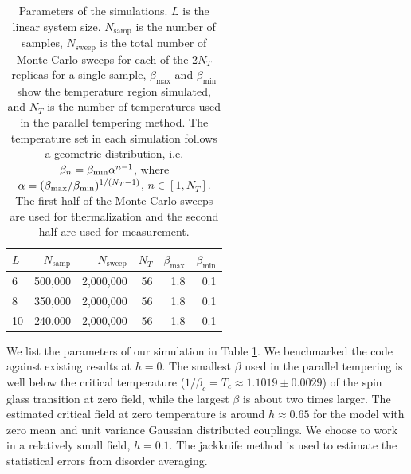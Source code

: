 \begin{table}[ht]
  \centering
  \caption{Parameters of the simulations.  $L$ is the linear system size.
$N_{\mathrm{samp}}$ is the number of samples, 
$N_{\mathrm{sweep}}$ is the total number of Monte Carlo sweeps for each of the 2$N_T$ replicas 
for a single sample, $\beta_{\mathrm{max}}$ and $\beta_{\mathrm{min}}$ show the temperature 
region simulated, and $N_T$ is the number of temperatures used in the parallel tempering method. 
The temperature set in each simulation follows a geometric distribution, 
i.e. $\beta_n=\beta_{\rm min}\alpha^{n-1}$, where $\alpha=(\beta_{\rm max}/\beta_{\rm min})^{1/(N_T-1)}$, $n\in [1,N_T]$.
The first half of the Monte Carlo sweeps are used for thermalization and the second half are used for measurement.}
 \begin{tabular}{lrrrrr}
    $L$&$N_{\mathrm{samp}}$&$N_{\mathrm{sweep}}$& $N_T$  &$\beta_{\mathrm{max}}$ &  $\beta_{\mathrm{min}}$  \\
\hline
6&500,000&2,000,000&56&1.8&0.1\\
8&350,000&2,000,000&56&1.8&0.1\\
10&240,000&2,000,000&56&1.8&0.1\\
  \end{tabular}
  \label{tab:parameters}
\end{table}

We list the parameters of our simulation in Table \ref{tab:parameters}. We 
benchmarked the code against existing results at $h=0$.  The smallest 
$\beta$ used in the parallel tempering is well below the critical temperature ($1/\beta_{c} = T_{c} \approx 1.1019 \pm 0.0029$) \cite{Baity-Jesi-etal-2013} of 
the spin glass transition at zero field\cite{PhysRevB.62.14237,Baity-Jesi-etal-2013}, while the largest $\beta$ 
is about two times larger.  The estimated critical field at zero temperature is around $h \approx 0.65$ for 
the model with zero mean and unit variance Gaussian distributed couplings\cite{Krzakala-etal-2001}. 
We choose to work in a relatively small field, $h=0.1$. 
The jackknife method is used to estimate the statistical errors from disorder averaging. 



